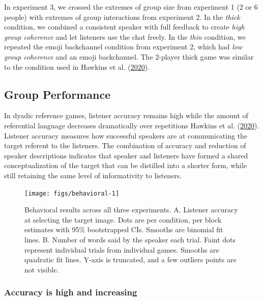 \documentclass[
  english,
  a4paper,
]{article}
\begin{document}
In experiment 3, we crossed the extremes of group size from experiment 1 (2 or 6 people) with extremes of group interactions from experiment 2. In the \emph{thick} condition, we combined a consistent speaker with full feedback to create \emph{high group coherence} and let listeners use the chat freely. In the \emph{thin} condition, we repeated the emoji backchannel condition from experiment 2, which had \emph{low group coherence} and an emoji backchannel. The 2-player thick game was similar to the condition used in Hawkins et al. (\protect\hyperlink{ref-hawkins2020}{2020}).

\hypertarget{group-performance}{%
\subsection{Group Performance}\label{group-performance}}

In dyadic reference games, listener accuracy remains high while the amount of referential language decreases dramatically over repetitions Hawkins et al. (\protect\hyperlink{ref-hawkins2020}{2020}). Listener accuracy measures how successful speakers are at communicating the target referent to the listeners. The combination of accuracy and reduction of speaker descriptions indicates that speaker and listeners have formed a shared conceptualization of the target that can be distilled into a shorter form, while still retaining the same level of informativity to listeners.

\begin{figure}[t!]

{\centering \texttt{[image: figs/behavioral-1]} 

}

\caption{Behavioral results across all three experiments. A. Listener accuracy at selecting the target image. Dots are per condition, per block estimates with 95\% bootstrapped CIs. Smooths are binomial fit lines. B. Number of words said by the speaker each trial. Faint dots represent individual trials from individual games. Smooths are quadratic fit lines. Y-axis is truncated, and a few outliers points are not visible. }\label{fig:behavioral}
\end{figure}

\hypertarget{accuracy-is-high-and-increasing}{%
\subsubsection{Accuracy is high and increasing}\label{accuracy-is-high-and-increasing}}
\end{document}
